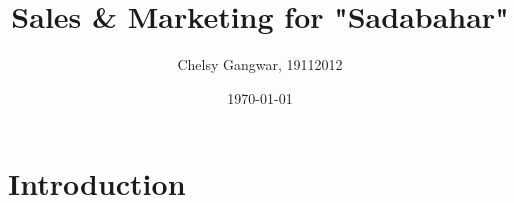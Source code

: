 \documentclass{article}
\title{Sales & Marketing for "Sadabahar"}
\author{Chelsy Gangwar, 19112012}
\date{\today}
\begin{document}
\maketitle


\section{Introduction}
\end{document}
